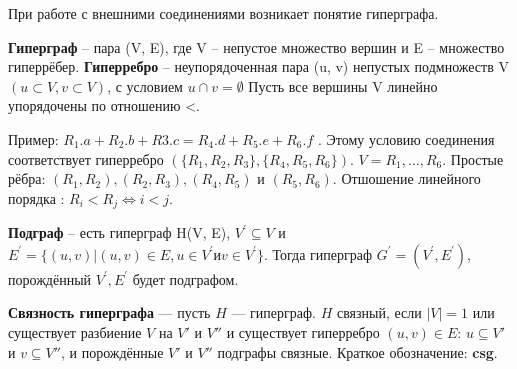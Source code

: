 \documentclass[12pt]{article}
\begin{document}
\begin{flushleft}
\begin{center}
\end{center}

При работе с внешними соединениями возникает понятие гиперграфа.

\textbf{Гиперграф} -- пара (V, E), где V -- непустое множество вершин 
и E -- множество гиперрёбер. 
\textbf{Гиперребро} -- неупорядоченная пара (u, v)
непустых подмножеств V$( u \subset V, v \subset V)$, с условием $u \cap v = \emptyset$
Пусть все вершины V линейно упорядочены по отношению <.
\begin{center}
\end{center}

Пример: 
$R_1.a + R_2.b + R3.c = R_4.d + R_5.e + R_6.f$ . Этому условию соединения 
соответствует гиперребро  $(\{R_1, R_2, R_3\}, \{R_4, R_5, R_6\})$. $V = {R_1, \dots , R_6}$. 
Простые рёбра:  $({R_1}, {R_2}), ({R_2}, {R_3}), ({R_4}, {R_5})$ и 
$({R_5}, {R_6})$. Отшошение линейного порядка : $R_i < R_j \Leftrightarrow  i < j$.

\textbf{Подграф} -- есть гиперграф H(V, E), $V^{'} \subseteq V$ и $E^{'} = \{(u, v) | (u, v) \in E, u \in V^{'} и v \in V^{'}\}$.
Тогда гиперграф $G^{'} = (V^{'}, E^{'})$, порождённый $V^{'}, E^{'}$ будет подграфом.
\newline

\textbf{Связность гиперграфа} — пусть $H$ — гиперграф. $H$ связный, если $|V| = 1$ или существует разбиение $V$ на $V'$ и $V''$ и существует гиперребро $(u, v) \in E$: $u \subseteq V'$ и $v \subseteq V''$, и порождённые $V'$ и $V''$ подграфы связные. Краткое обозначение: \textbf{csg}.


\end{flushleft}
\end{document}
